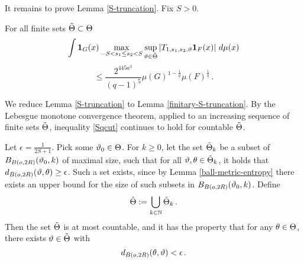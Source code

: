 It remains to prove Lemma \ref{S-truncation}. Fix $S>0$.
\begin{lemma}
\label{finitary-S-truncation}
For all finite sets $\tilde{{\Theta}}\subset {\Theta}$
$$
    \int \mathbf{1}_{G}(x)
    \max_{-S<s_1\le s_2<S}\sup_{{\vartheta}\in\tilde{{\Theta}}}
    \left| T_{1, s_1,s_2,{\vartheta}} \mathbf{1}_{F}(x) \right|\, d\mu(x)
$$
\begin{equation} \label{Sqcut}
\leq \frac{2^{445a^3}}{(q-1)^5} \mu(G)^{1-\frac{1}{q}} \mu(F)^{\frac{1}{q}}\,.
\end{equation}
\end{lemma}

We reduce Lemma \ref{S-truncation} to Lemma \ref{finitary-S-truncation}.
By the Lebesgue monotone convergence theorem,
applied to an increasing sequence of finite sets $\tilde{{\Theta}}$, inequality \eqref{Sqcut}
continues to hold for countable $\tilde{{\Theta}}$.

Let $\epsilon=\frac{1}{2S+1}$. Pick some ${\vartheta}_0 \in {\Theta}$.
For $k \ge 0$, let the set $\tilde{{\Theta}}_k$ be a subset of $B_{B(o,2R)}({\vartheta}_0, k)$ of maximal size, such that for all ${\vartheta}, {\theta} \in \tilde{{\Theta}}_k$, it holds that $d_{B(o, 2R)}({\vartheta}, {\theta}) \ge \epsilon$. Such a set exists, since by Lemma \ref{ball-metric-entropy} there exists an upper bound for the size of such subsets in $B_{B(o, 2R)}({\vartheta}_0, k)$. Define
$$
    \tilde{{\Theta}} := \bigcup_{k \in \mathbb{N}} \tilde{{\Theta}}_k\,.
$$
Then the set $\tilde{{\Theta}}$ is at most countable, and it has the property that for any ${\theta} \in {\Theta}$, there exists ${\vartheta} \in \tilde{{\Theta}}$ with
$$
    d_{B(o, 2R)}({\theta}, {\vartheta}) < \epsilon\,.
$$

